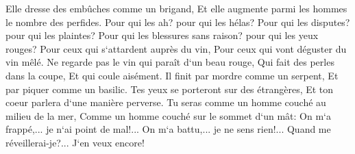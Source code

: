 \verse Elle dresse des embûches comme un brigand, Et elle augmente parmi les hommes le nombre des perfides. 
\verse Pour qui les ah? pour qui les hélas? Pour qui les disputes? pour qui les plaintes? Pour qui les blessures sans raison? pour qui les yeux rouges? 
\verse Pour ceux qui s`attardent auprès du vin, Pour ceux qui vont déguster du vin mêlé. 
\verse Ne regarde pas le vin qui paraît d`un beau rouge, Qui fait des perles dans la coupe, Et qui coule aisément. 
\verse Il finit par mordre comme un serpent, Et par piquer comme un basilic. 
\verse Tes yeux se porteront sur des étrangères, Et ton coeur parlera d`une manière perverse. 
\verse Tu seras comme un homme couché au milieu de la mer, Comme un homme couché sur le sommet d`un mât: 
\verse On m`a frappé,... je n`ai point de mal!... On m`a battu,... je ne sens rien!... Quand me réveillerai-je?... J`en veux encore! 

